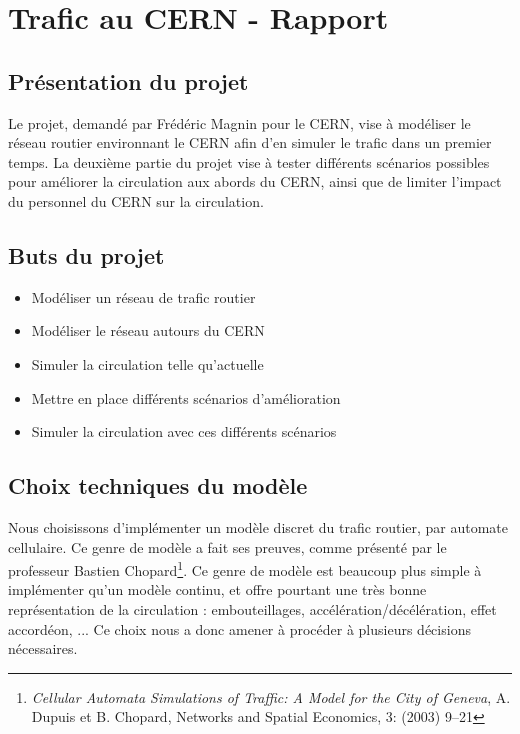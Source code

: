 \documentclass[a4paper,11pt]{extarticle}
\begin{document}
\pagestyle{fancy}
\renewcommand{\headheight}{24pt}
\rhead{\today}

\section*{Trafic au CERN - Rapport}

\subsection*{Présentation du projet}

Le projet, demandé par Frédéric Magnin pour le CERN, vise à modéliser le réseau routier environnant le CERN afin d'en simuler le trafic dans un premier temps. La deuxième partie du projet vise à tester différents scénarios possibles pour améliorer la circulation aux abords du CERN, ainsi que de limiter l'impact du personnel du CERN sur la circulation.

\subsection*{Buts du projet}

\begin{itemize}
\item Modéliser un réseau de trafic routier
\item Modéliser le réseau autours du CERN
\item Simuler la circulation telle qu'actuelle
\item Mettre en place différents scénarios d'amélioration
\item Simuler la circulation avec ces différents scénarios
\end{itemize}


\subsection*{Choix techniques du modèle}

Nous choisissons d'implémenter un modèle discret du trafic routier, par automate cellulaire. Ce genre de modèle a fait ses preuves, comme présenté par le professeur Bastien Chopard\footnote{\emph{Cellular Automata Simulations of Traffic:
A Model for the City of Geneva}, A. Dupuis et B. Chopard, Networks and Spatial Economics, 3: (2003) 9–21}. Ce genre de modèle est beaucoup plus simple à implémenter qu'un modèle continu, et offre pourtant une très bonne représentation de la circulation : embouteillages, accélération/décélération, effet accordéon, ... Ce choix nous a donc amener à procéder à plusieurs décisions nécessaires.\newline
\end{document}
